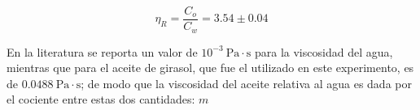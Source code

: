\documentclass[final,5p,times,twocolumn, nopreprintline]{elsarticle}
\numberwithin{equation}{section}
\begin{document}
\begin{equation}
\eta_R=\dfrac{C_o}{C_w}=3.54\pm0.04
\end{equation}\label{eq4.3}

En la literatura se reporta un valor de $10^{-3}~\text{Pa}\cdot\text{s}$ \cite{kestin1978viscosity} para la viscosidad del agua, mientras que para el aceite de girasol, que fue el utilizado en este experimento, es de $0.0488~\text{Pa}\cdot\text{s}$; de modo que la viscosidad del aceite relativa al agua es dada por el cociente entre estas dos cantidades: $m$

 







\end{document}
